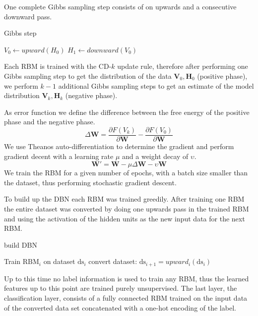 One complete Gibbs sampling step consists of on upwards and a consecutive downward pass.

\begin{algorithm}
\caption{Gibbs step}
\begin{algorithmic}
\State $V_0 \gets upward(H_0) $  
\State $H_1 \gets downward(V_0) $  
\end{algorithmic}
\end{algorithm}

Each RBM is trained with the CD-$k$ update rule, therefore after performing one Gibbs sampling step to get the distribution of the data $\textbf{V}_0, \textbf{H}_0$  (positive phase), we perform $k-1$ additional Gibbs sampling steps to get an estimate of the model distribution $\textbf{V}_k, \textbf{H}_k$  (negative phase).

As error function we define the difference between the free energy of the positive phase and the negative phase.
\[
\Delta \textbf{W} = \frac{\partial F(V_k)}{\partial \textbf{W}} -  \frac{\partial F(V_0)}{\partial \textbf{W}} 
\]
We use Theanos auto-differentiation to determine the gradient and perform gradient decent with a learning rate $\mu$ and a weight decay of $\upsilon$.
\[
\textbf{W}' = \textbf{W} - \mu \Delta \textbf{W} - \upsilon \textbf{W} 
\]
We train the RBM for a given number of epochs, with a batch size smaller than the dataset, thus performing stochastic gradient descent.

To build up the DBN each RBM was trained greedily.
After training one RBM the entire dataset was converted by doing one upwards pass in the trained RBM and using the activation of the hidden units as the new input data for the next RBM.

\begin{algorithm}
\caption{build DBN}
\begin{algorithmic}
\State Train $\text{RBM}_i$ on dataset $\text{ds}_i$
\State convert dataset: $\text{ds}_{i+1} = upward_i(\text{ds}_i)$ 
\EndFor
\end{algorithmic}
\end{algorithm}

Up to this time no label information is used to train any RBM, thus the learned features up to this point are trained purely unsupervised.
The last layer, the classification layer, consists of a fully connected RBM trained on the input data of the converted data set concatenated with a one-hot encoding of the label.



